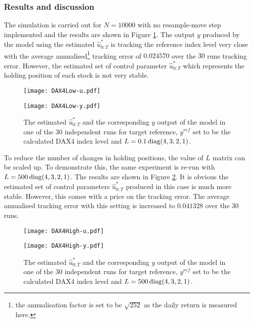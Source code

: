 \subsubsection{Results and discussion}
The simulation is carried out for $N=10000$ with no resample-move step implemented and the results are shown in Figure \ref{fig:dax4}. The output $y$ produced by the model using the estimated $\hat{u}^*_{0:T}$ is tracking the reference index level very close with the average annualised\footnote{the annualisation factor is set to be $\sqrt{252}$ as the daily return is measured here.} tracking error of $0.024570$ over the $30$ runs tracking error. However, the estimated set of control parameter $\hat{u}^*_{0:T}$ which represents the holding position of each stock is not very stable.

\begin{figure}[tbp]
\centering
    \begin{minipage}{0.5\textwidth}
        \centering
        \texttt{[image: DAX4Low-u.pdf]}
    \end{minipage}%
    \begin{minipage}{0.5\textwidth}
        \centering
        \texttt{[image: DAX4Low-y.pdf]}
    \end{minipage}
\caption{The estimated $\hat{u}^*_{0:T}$ and the corresponding $y$ output of the model in one of the 30 independent runs for target reference, $y^{ref}$ set to be the calculated DAX4 index level and $L = 0.1\operatorname{diag}(4,3,2,1)$.}
\label{fig:dax4}
\end{figure}

To reduce the number of changes in holding positions, the value of $L$ matrix can be scaled up. To demonstrate this, the same experiment is re-run with $L = 500\operatorname{diag}(4,3,2,1)$. The results are shown in Figure \ref{fig:dax42}. It is obvious the estimated set of control parameters $\hat{u}^*_{0:T}$ produced in this case is much more stable. However, this comes with a price on the tracking error. The average annualised tracking error with this setting is increased to $0.041328$ over the $30$ runs. 

\begin{figure}[htbp]
\centering
    \begin{minipage}{0.5\textwidth}
        \centering
        \texttt{[image: DAX4High-u.pdf]}
    \end{minipage}%
    \begin{minipage}{0.5\textwidth}
        \centering
        \texttt{[image: DAX4High-y.pdf]}
    \end{minipage}
\caption{The estimated $\hat{u}^*_{0:T}$ and the corresponding $y$ output of the model in one of the 30 independent runs for target reference, $y^{ref}$ set to be the calculated DAX4 index level and $L = 500\operatorname{diag}(4,3,2,1)$.}
\label{fig:dax42}
\end{figure}

